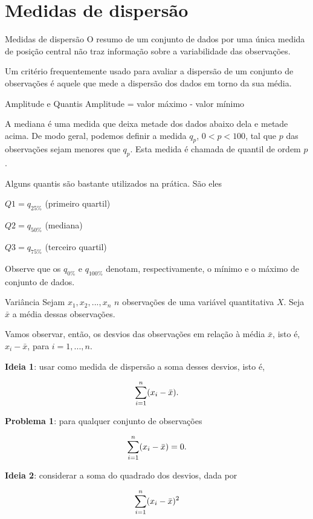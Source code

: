 \documentclass[
  9pt,
  ignorenonframetext,
  aspectratio=169]{beamer}
\begin{document}
\hypertarget{medidas-de-dispersuxe3o}{%
\section{Medidas de dispersão}\label{medidas-de-dispersuxe3o}}

\begin{frame}{Medidas de dispersão}
\protect\hypertarget{medidas-de-dispersuxe3o-1}{}
O resumo de um conjunto de dados por uma única medida de posição central
não traz informação sobre a variabilidade das observações.

Um critério frequentemente usado para avaliar a dispersão de um conjunto
de observações é aquele que mede a dispersão dos dados em torno da sua
média.
\end{frame}

\begin{frame}{Amplitude e Quantis}
\protect\hypertarget{amplitude-e-quantis}{}
Amplitude = valor máximo - valor mínimo

A mediana é uma medida que deixa metade dos dados abaixo dela e metade
acima. De modo geral, podemos definir a medida \(q_p\), \(0 < p < 100\),
tal que \(p%
\) das observações sejam menores que \(q_p\). Esta medida é chamada de
quantil de ordem \(p\).

Alguns quantis são bastante utilizados na prática. São eles

\(Q1 = q_{25\%}\) (primeiro quartil)

\(Q2 = q_{50\%}\) (mediana)

\(Q3 = q_{75\%}\) (terceiro quartil)

Observe que os \(q_{0\%}\) e \(q_{100\%}\) denotam, respectivamente, o
mínimo e o máximo de conjunto de dados.
\end{frame}

\begin{frame}{Variância}
\protect\hypertarget{variuxe2ncia}{}
Sejam \(x_1, x_2, ..., x_n\) \(n\) observações de uma variável
quantitativa \(X\). Seja \(\bar{x}\) a média dessas observações.

Vamos observar, então, os desvios das observações em relação à média
\(\bar{x}\), isto é, \(x_i - \bar{x}\), para \(i = 1, ..., n\).

\textbf{Ideia 1}: usar como medida de dispersão a soma desses desvios,
isto é,

\[ \Large
\sum_{i=1}^{n}(x_i - \bar{x}).
\]
\end{frame}

\begin{frame}{}
\protect\hypertarget{section-4}{}
\textbf{Problema 1}: para qualquer conjunto de observações

\[ \Large
\sum_{i=1}^{n}(x_i - \bar{x}) = 0.
\]

\textbf{Ideia 2}: considerar a soma do quadrado dos desvios, dada por

\[ \Large
\sum_{i=1}^{n}(x_i - \bar{x})^2
\]
\end{frame}
\end{document}

